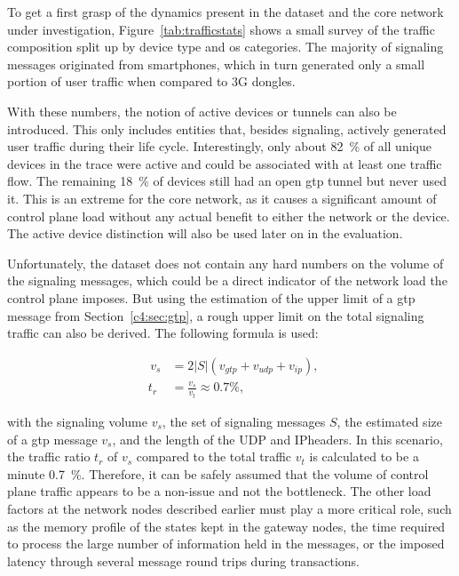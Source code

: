 To get a first grasp of the dynamics present in the dataset and the core network under investigation, Figure~\ref{tab:trafficstats} shows a small survey of the traffic composition split up by device type and \gls{os} categories. The majority of signaling messages originated from smartphones, which in turn generated only a small portion of user traffic when compared to \gls{3G} dongles.

With these numbers, the notion of active devices or tunnels can also be introduced. This only includes entities that, besides signaling, actively generated user traffic during their life cycle. Interestingly, only about \SI{82}{\percent} of all unique devices in the trace were active and could be associated with at least one traffic flow. The remaining \SI{18}{\percent} of devices still had an open \gls{gtp} tunnel but never used it. This is an extreme for the core network, as it causes a significant amount of control plane load without any actual benefit to either the network or the device. The active device distinction will also be used later on in the evaluation.

Unfortunately, the dataset does not contain any hard numbers on the volume of the signaling messages, which could be a direct indicator of the network load the control plane imposes. But using the estimation of the upper limit of a \gls{gtp} message from Section~\ref{c4:sec:gtp}, a rough upper limit on the total signaling traffic can also be derived. The following formula is used:

\begin{align}
	\phantom{,}v_s &= 2\left|S\right|(v_{gtp} + v_{udp} + v_{ip})\text{,}\\
	\phantom{.}t_r &= \frac{v_s}{v_t} \approx 0.7\si{\percent}\text{,}
\end{align}

with the signaling volume $v_s$, the set of signaling messages $S$, the estimated size of a \gls{gtp} message $v_s$, and the length of the \gls{UDP} and \gls{IP}headers. In this scenario, the traffic ratio $t_r$ of $v_s$ compared to the total traffic $v_t$ is calculated to be a minute \SI{0.7}{\percent}. Therefore, it can be safely assumed that the volume of control plane traffic appears to be a non-issue and not the bottleneck. The other load factors at the network nodes described earlier must play a more critical role, such as the memory profile of the states kept in the gateway nodes, the time required to process the large number of information held in the messages, or the imposed latency through several message round trips during transactions.

